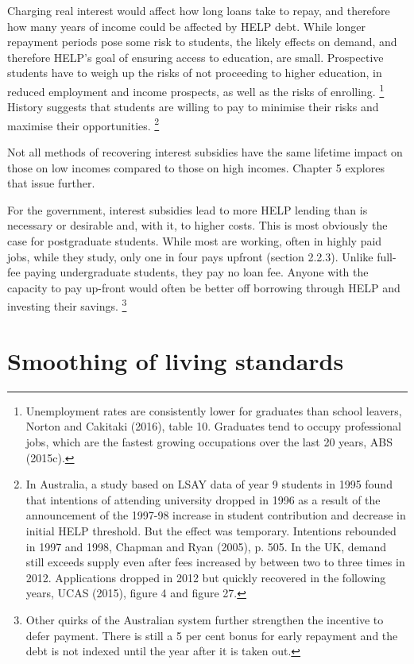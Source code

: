 \documentclass[embargoed]{grattan}
\begin{document}
Charging real interest would affect how long loans take to repay, and therefore how many years of income could be affected by HELP debt.
While longer repayment periods pose some risk to students, the likely effects on demand, and therefore HELP's goal of ensuring access to education, are small.
Prospective students have to weigh up the risks of not proceeding to higher education, in reduced employment and income prospects, as well as the risks of enrolling.%
\footnote{Unemployment rates are consistently lower for graduates than school leavers, Norton and Cakitaki (2016), table 10.
Graduates tend to occupy professional jobs, which are the fastest growing occupations over the last 20 years, ABS (2015c).} History suggests that students are willing to pay to minimise their risks and maximise their opportunities.%
\footnote{In Australia, a study based on LSAY data of year 9 students in 1995 found that intentions of attending university dropped in 1996 as a result of the announcement of the 1997-98 increase in student contribution and decrease in initial HELP threshold.
But the effect was temporary.
Intentions rebounded in 1997 and 1998, Chapman and Ryan (2005), p. 505.
In the UK, demand still exceeds supply even after fees increased by between two to three times in 2012.
Applications dropped in 2012 but quickly recovered in the following years, UCAS (2015), figure 4 and figure 27.}

Not all methods of recovering interest subsidies have the same lifetime impact on those on low incomes compared to those on high incomes.
Chapter 5 explores that issue further.

For the government, interest subsidies lead to more HELP lending than is necessary or desirable and, with it, to higher costs.
This is most obviously the case for postgraduate students.
While most are working, often in highly paid jobs, while they study, only one in four pays upfront (section 2.2.3).
Unlike full-fee paying undergraduate students, they pay no loan fee.
Anyone with the capacity to pay up-front would often be better off borrowing through HELP and investing their savings.%
\footnote{Other quirks of the Australian system further strengthen the incentive to defer payment.
There is still a 5 per cent bonus for early repayment and the debt is not indexed until the year after it is taken out.}

\section{Smoothing of living standards}\label{smoothing-of-living-standards}
\end{document}
